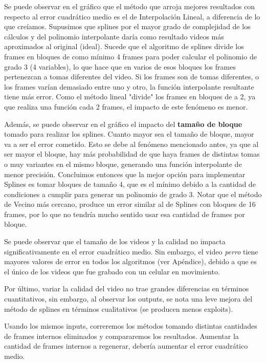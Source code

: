 \par Se puede observar en el gráfico que el método que arroja mejores resultados con respecto al error cuadrático medio es el de Interpolación Lineal, a diferencia de lo que creíamos. Supusimos que splines por el mayor grado de complejidad de los cálculos y del polinomio interpolante daría como resultado videos más aproximados al original (ideal). Sucede que el algoritmo de splines divide los frames en bloques de como mínimo 4 frames para poder calcular el polinomio de grado 3 (4 variables), lo que hace que en varios de esos bloques los frames pertenezcan a tomas diferentes del video. Si los frames son de tomas diferentes, o los frames varían demasiado entre uno y otro, la función interpolante resultante tiene más error. Como el método lineal "divide" los frames en bloques de a 2, ya que realiza una función cada 2 frames, el impacto de este fenómeno es menor.
\par Además, se puede observar en el gráfico el impacto del \textbf{tamaño de bloque }tomado para realizar los splines. Cuanto mayor sea el tamaño de bloque, mayor va a ser el error cometido. Esto se debe al fenómeno mencionado antes, ya que al ser mayor el bloque, hay más probabilidad de que haya frames de distintas tomas o muy variantes en el mismo bloque, generando una función interpolante de menor precisión. Concluimos entonces que la mejor opción para implementar Splines es tomar bloques de tamaño 4, que es el mínimo debido a la cantidad de condiciones a cumplir para generar un polinomio de grado 3. Notar que el método de Vecino más cercano, produce un error similar al de Splines con bloques de 16 frames, por lo que no tendría mucho sentido usar esa cantidad de frames por bloque.
\par Se puede observar que el tamaño de los videos y la calidad no impacta significativamente en el error cuadrático medio. Sin embargo, el video \textit{perro}  tiene mayores valores de error en todos los algoritmos (ver Apéndice), debido a que es el único de los videos que fue grabado con un celular en movimiento.
\par Por último, variar la calidad del video no trae grandes diferencias en términos cuantitativos, sin embargo, al observar los outputs, se nota una leve mejora del método de splines en términos cualitativos (se producen menos exploits). 


\par Usando los mismos inputs, correremos los métodos tomando distintas cantidades de frames internos eliminados y compararemos los resultados. Aumentar la cantidad de frames internos a regenerar, debería aumentar el error cuadrático medio.

